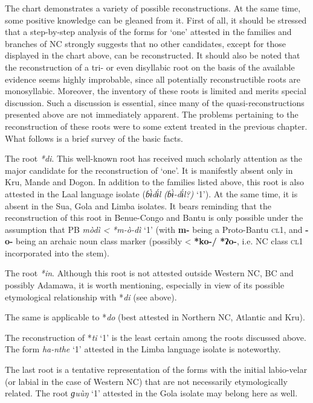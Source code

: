 The chart demonstrates a variety of possible reconstructions. At the same time, some positive knowledge can be gleaned from it. First of all, it should be stressed that a step-by-step analysis of the forms for ‘one’ attested in the families and branches of NC strongly suggests that no other candidates, except for those displayed in the chart above, can be reconstructed. It should also be noted that the reconstruction of a tri- or even disyllabic root on the basis of the available evidence seems highly improbable, since all potentially reconstructible roots are monosyllabic. Moreover, the inventory of these roots is limited and merits special discussion. Such a discussion is essential, since many of the quasi-reconstructions presented above are not immediately apparent. The problems pertaining to the reconstruction of these roots were to some extent treated in the previous chapter. What follows is a brief survey of the basic facts.

The root \textit{*di}. This well-known root has received much scholarly attention as the major candidate for the reconstruction of ‘one’. It is manifestly absent only in Kru, Mande and Dogon. In addition to the families listed above, this root is also attested in the Laal language isolate (\textit{ɓ{\`{ɨ}}d{\'{ɨ}}l} \textit{(ɓ{\`{ɨ}}-d{\'{ɨ}}l?)} ‘1’). At the same time, it is absent in the Sua, Gola and Limba isolates. It bears reminding that the reconstruction of this root in Benue-Congo and Bantu is only possible under the assumption that PB \textit{mòdì} \textit{<} \textit{*m-ò-dì} ‘1’ (with \textbf{m-} being a Proto-Bantu \textsc{cl}1, and \textbf{-}\textbf{o-} being an archaic noun class marker (possibly < \textbf{*ko}\textbf{-/ *ʔ}\textbf{o-}, i.e. NC class \textsc{cl}1 incorporated into the stem).

The root \textit{*in}. Although this root is not attested outside Western NC, BC and possibly Adamawa, it is worth mentioning, especially in view of its possible etymological relationship with *\textit{di} (see above).

The same is applicable to *\textit{do} (best attested in Northern NC, Atlantic and Kru).

The reconstruction of *\textit{ti} ‘1’ is the least certain among the roots discussed above. The form \textit{ha-nthe} ‘1’ attested in the Limba language isolate is noteworthy.

The last root is a tentative representation of the forms with the initial labio-velar (or labial in the case of Western NC) that are not necessarily etymologically related. The root \textit{ɡu{\`{u}}ŋ} ‘1’ attested in the Gola isolate may belong here as well. 


